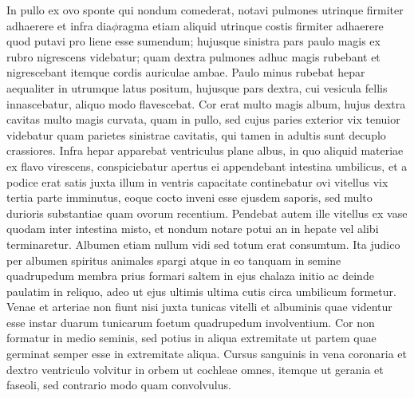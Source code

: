 \pstart%
In pullo ex ovo sponte
qui nondum comederat, notavi pulmones
utrinque firmiter adhaerere et infra dia$\phi$ragma etiam aliquid utrinque costis firmiter adhaerere quod putavi pro liene esse sumendum;
hujusque sinistra pars paulo magis ex rubro nigrescens videbatur; quam dextra pulmones adhuc magis rubebant et nigrescebant itemque cordis auriculae ambae. Paulo minus rubebat hepar aequaliter in utrumque latus positum, hujusque pars dextra, cui vesicula fellis innascebatur, aliquo modo flavescebat. Cor erat multo magis album, hujus dextra cavitas multo magis curvata, quam in pullo, sed cujus paries exterior vix tenuior videbatur quam parietes sinistrae cavitatis, qui tamen in adultis sunt decuplo crassiores. Infra hepar apparebat ventriculus plane albus, in quo aliquid materiae ex flavo virescens, conspiciebatur
apertus ei appendebant intestina umbilicus, et a podice erat satis
juxta illum in ventris capacitate continebatur ovi vitellus vix tertia parte imminutus, eoque cocto inveni esse ejusdem saporis, sed multo durioris substantiae quam ovorum recentium. Pendebat autem ille vitellus ex vase quodam inter intestina misto, et nondum notare potui an in hepate vel alibi terminaretur. Albumen etiam nullum vidi sed totum erat consumtum.
\pend%
\pstart%
Ita judico per albumen spiritus animales spargi atque in eo tanquam in semine quadrupedum membra prius formari saltem in ejus chalaza initio ac deinde paulatim in reliquo, adeo ut ejus ultimis
ultima cutis circa umbilicum formetur.
\pend%
\pstart%
Venae et arteriae non fiunt nisi juxta tunicas vitelli et albuminis quae videntur esse instar duarum tunicarum foetum quadrupedum involventium.
\pend%
\newpage
\pstart%
Cor non formatur in medio seminis, sed potius in aliqua extremitate ut
partem quae germinat semper esse in extremitate aliqua.
\pend%
\pstart%
Cursus sanguinis in vena coronaria et dextro ventriculo volvitur in orbem ut cochleae omnes, itemque ut gerania et faseoli, sed contrario modo quam convolvulus.
